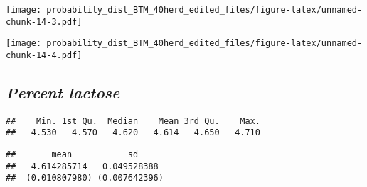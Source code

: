 \documentclass[]{article}
\newenvironment{Shaded}{\begin{snugshade}}{\end{snugshade}}
\newcommand{\KeywordTok}[1]{\textcolor[rgb]{0.13,0.29,0.53}{\textbf{#1}}}
\newcommand{\StringTok}[1]{\textcolor[rgb]{0.31,0.60,0.02}{#1}}
\newcommand{\CommentTok}[1]{\textcolor[rgb]{0.56,0.35,0.01}{\textit{#1}}}
\newcommand{\OperatorTok}[1]{\textcolor[rgb]{0.81,0.36,0.00}{\textbf{#1}}}
\newcommand{\NormalTok}[1]{#1}
\begin{document}
\texttt{[image: probability\_dist\_BTM\_40herd\_edited\_files/figure-latex/unnamed-chunk-14-3.pdf]}

\begin{Shaded}
\end{Shaded}

\texttt{[image: probability\_dist\_BTM\_40herd\_edited\_files/figure-latex/unnamed-chunk-14-4.pdf]}

\subsection{\texorpdfstring{\textbf{\emph{Percent
lactose}}}{Percent lactose}}\label{percent-lactose}

\begin{Shaded}
\end{Shaded}

\begin{verbatim}
##    Min. 1st Qu.  Median    Mean 3rd Qu.    Max. 
##   4.530   4.570   4.620   4.614   4.650   4.710
\end{verbatim}

\begin{Shaded}
\end{Shaded}

\begin{verbatim}
##       mean           sd     
##   4.614285714   0.049528388 
##  (0.010807980) (0.007642396)
\end{verbatim}
\end{document}
